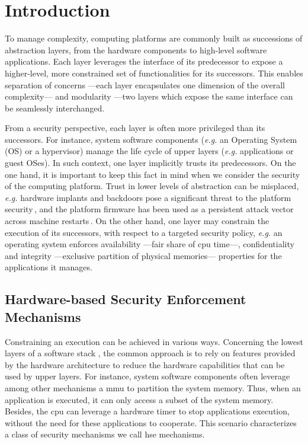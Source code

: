 \chapter{Introduction}
\label{chapter:introduction}


\vspace{1cm}\noindent
%
To manage complexity, computing platforms are commonly built as successions of
abstraction layers, from the hardware components to high-level software
applications.
%
Each layer leverages the interface of its predecessor to expose a higher-level,
more constrained set of functionalities for its successors.
%
This enables separation of concerns ---each layer encapsulates one dimension of
the overall complexity--- and modularity ---two layers which expose the same
interface can be seamlessly interchanged.

From a security perspective, each layer is often more privileged than its
successors.
%
For instance, system software components (\emph{e.g.} an Operating System (OS)  or a
hypervisor) manage the life cycle of upper layers (\emph{e.g.} applications or 
guest OSes).
%
In such context, one layer implicitly trusts its predecessors.
%
On the one hand, it is important to keep this fact in mind when we consider the
security of the computing platform.
%
Trust in lower levels of abstraction can be misplaced, \emph{e.g.} hardware
implants and backdoors pose a significant threat to the platform
security\,\cite{yang2016a2}, and the platform firmware has been used as a
persistent attack vector across machine restarts\,\cite{embleton2013smm}.
%
On the other hand, one layer may constrain the execution of its successors, with
respect to a targeted security policy, \emph{e.g.}  an operating system enforces
availability ---fair share of \ac{cpu} time---, confidentiality and integrity
---exclusive partition of physical memories--- properties for the applications
it manages.

\section{Hardware-based Security Enforcement Mechanisms}

Constraining an execution can be achieved in various ways.
%
Concerning the lowest layers of a software stack , the common approach is to rely
on features provided by the hardware architecture to reduce the hardware
capabilities that can be used by upper layers.
%
For instance, system software components  often leverage among other mechanisms a
\ac{mmu} to partition the system memory.
%
Thus, when an application is executed, it can only access a subset of the system
memory.
%
Besides, the \ac{cpu} can leverage a hardware timer to stop applications
execution, without the need for these applications to cooperate.
%
This scenario characterizes a class of security mechanisms we call \ac{hse}
mechanisms.


